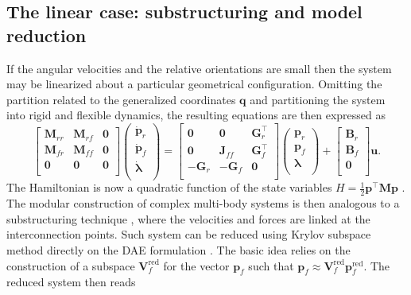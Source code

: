 \subsection{The linear case: substructuring and model reduction}
If the angular velocities and the relative orientations are small then the system may be linearized about a particular geometrical configuration. Omitting the partition related to the generalized coordinates $\mathbf{q}$ and partitioning the system into rigid and flexible dynamics, the resulting equations are then expressed as 
\begin{equation}
\label{eq:mbd_linear}
\begin{bmatrix}
\mathbf{M}_{rr} & \mathbf{M}_{rf} & \mathbf{0} \\ 
\mathbf{M}_{fr} & \mathbf{M}_{ff} & \mathbf{0} \\
\mathbf{0} & \mathbf{0} & \mathbf{0} \\
\end{bmatrix}
\begin{pmatrix}
\dot{\mathbf{p}}_r \\ \dot{\mathbf{p}}_f \\ \dot{\bm{\lambda}} \\ 
\end{pmatrix} = 
\begin{bmatrix}
\mathbf{0} & \mathbf{0} & \mathbf{G}_r^\top \\ 
\mathbf{0} & \mathbf{J}_{ff} & \mathbf{G}_f^\top \\ 
-\mathbf{G}_r & -\mathbf{G}_f & \mathbf{0} \\
\end{bmatrix}
\begin{pmatrix}
\mathbf{p}_r \\ \mathbf{p}_f \\ {\bm{\lambda}} \\ 
\end{pmatrix} + 
\begin{bmatrix}
\mathbf{B}_r \\ \mathbf{B}_f \\ \mathbf{0} \\
\end{bmatrix}\mathbf{u}.
\end{equation}
The Hamiltonian is now a quadratic function of the state variables $H = \frac{1}{2} \mathbf{p}^\top\mathbf{M}\mathbf{p}$ \cite{beattie2018linear}.
The modular construction of complex multi-body systems is then analogous to a substructuring technique \cite{klerk2008}, where the velocities and forces are linked at the interconnection points. Such system can be reduced using Krylov subspace method directly on the DAE formulation \cite{egger2018}. The basic idea relies on the construction of a subspace $\mathbf{V}_f^{\text{red}}$ for the vector $\mathbf{p}_f$ such that $\mathbf{p}_f \approx \mathbf{V}_f^{\text{red}} \mathbf{p}_f^{\text{red}}$. The reduced system then reads

